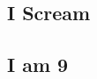 \documentclass[a4paper]{article}
\begin{document}
\subsection{I Scream}

\subsection{I am 9}
\end{document}
